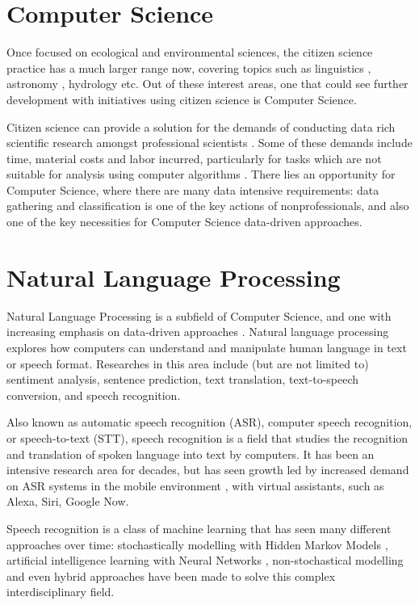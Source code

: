 \section*{Computer Science}

Once focused on ecological and environmental sciences, the citizen science practice has a much larger range now, covering topics such as linguistics \cite{svendsen2018dynamics}, astronomy \cite{marshall2015ideas}, hydrology \cite{buytaert2014citizen} etc. Out of these interest areas, one that could see further development with initiatives using citizen science is Computer Science.

Citizen science can provide a solution for the demands of conducting data rich scientific research amongst 
professional scientists \cite{greenhill2014playing}. Some of these demands include time, material costs and labor incurred, particularly for tasks which are not suitable for analysis using computer algorithms \cite{silvertown2009new}. There lies an opportunity for Computer Science, where there are many data intensive requirements: data gathering and classification is one of the key actions of nonprofessionals, and also one of the key necessities for Computer Science data-driven approaches.

\section*{Natural Language Processing}

Natural Language Processing is a subfield of Computer Science, and one with increasing emphasis on data-driven approaches \cite{moore2003comparison}. Natural language processing explores how computers can understand and manipulate human language in text or speech format. Researches in this area include (but are not limited to) sentiment analysis, sentence prediction, text translation, text-to-speech conversion, and speech recognition.

Also known as automatic speech recognition (ASR), computer speech recognition, or speech-to-text (STT), speech recognition is a field that studies the recognition and translation of spoken language into text by computers. It has been an intensive research area for decades, but has seen growth led by increased demand on ASR systems in the mobile environment \cite{yu2016automatic}, with virtual assistants, such as Alexa, Siri, Google Now.

Speech recognition is a class of machine learning that has seen many different approaches over time: stochastically modelling with Hidden Markov Models  \cite{gales2008application}, artificial intelligence learning with Neural Networks \cite{graves2013speech}, non-stochastical modelling \cite{burget2003nonrandomattr} and even hybrid approaches \cite{wang2020transformer} have been made to solve this complex interdisciplinary field.

